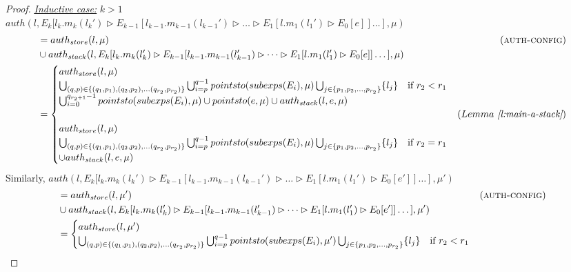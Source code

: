 \documentclass{llncs}
\begin{document}
\begin{proof}
\noindent\underline{\underline{\textit{Inductive case:}}} $k > 1$\\
\noindent$auth(l, E_k[l_k.m_k(l_k') \rhd E_{k-1}[l_{k-1}.m_{k-1}(l_{k-1}') \rhd \dots \rhd E_1[l.m_1(l_1') \rhd E_0[e]] \dots ], \mu)$
\vspace{-7pt}
\begin{align*}
&= auth_{store}(l, \mu) & (\textsc{auth-config})\\
&\cup auth_{stack}(l, E_k[l_k.m_k(l_k') \rhd E_{k-1}[l_{k-1}.m_{k-1}(l_{k-1}') \rhd \dots \rhd E_1[l.m_1(l_1') \rhd E_0[e]] \dots ], \mu)\\
&=
\begin{cases}
    auth_{store}(l, \mu)\\
    \bigcup_{(q, p) \in \{ (q_1, p_1), (q_2, p_2), \dots (q_{r_2}, p_{r_2}) \}} \bigcup^{q-1}_{i = p} pointsto(subexps(E_i), \mu) \bigcup_{j \in \{ p_1, p_2, \dots, p_{r_2} \}} \{ l_j \} & \text{if } r_2 < r_1\\
    \bigcup^{q_{r_2+1}-1}_{i = 0} pointsto(subexps(E_i), \mu) \cup pointsto(e, \mu) \cup auth_{stack}(l, e, \mu)\\\\
    auth_{store}(l, \mu)\\
    \bigcup_{(q, p) \in \{ (q_1, p_1), (q_2, p_2), \dots (q_{r_2}, p_{r_2}) \}} \bigcup^{q-1}_{i = p} pointsto(subexps(E_i), \mu) \bigcup_{j \in \{ p_1, p_2, \dots, p_{r_2} \}} \{ l_j \} & \text{if } r_2 = r_1\\
    \cup auth_{stack}(l, e, \mu)\\
\end{cases} & (Lemma~\textit{\ref{l:main-a-stack}})
\end{align*}
Similarly,
\noindent$auth(l, E_k[l_k.m_k(l_k') \rhd E_{k-1}[l_{k-1}.m_{k-1}(l_{k-1}') \rhd \dots \rhd E_1[l.m_1(l_1') \rhd E_0[e']] \dots ], \mu')$
\vspace{-7pt}
\begin{align*}
&= auth_{store}(l, \mu') & (\textsc{auth-config})\\
&\cup auth_{stack}(l, E_k[l_k.m_k(l_k') \rhd E_{k-1}[l_{k-1}.m_{k-1}(l_{k-1}') \rhd \dots \rhd E_1[l.m_1(l_1') \rhd E_0[e']] \dots ], \mu')\\
&=
\begin{cases}
    auth_{store}(l, \mu')\\
    \bigcup_{(q, p) \in \{ (q_1, p_1), (q_2, p_2), \dots (q_{r_2}, p_{r_2}) \}} \bigcup^{q-1}_{i = p} pointsto(subexps(E_i), \mu') \bigcup_{j \in \{ p_1, p_2, \dots, p_{r_2} \}} \{ l_j \} & \text{if } r_2 < r_1\\

\end{cases}
\end{align*}
\end{proof}
\end{document}
